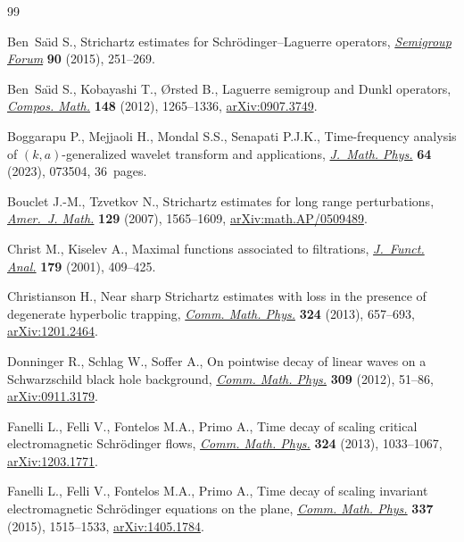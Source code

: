 \documentclass[10pt,a4paper]{amsart}
\numberwithin{equation}{section}
\begin{document}
\begin{thebibliography}{99}
\footnotesize\itemsep=0pt

Ben~Sa\"{\i}d S., Strichartz estimates for {S}chr\"odinger--{L}aguerre
 operators, \href{https://doi.org/10.1007/s00233-014-9617-9}{\textit{Semigroup Forum}} \textbf{90} (2015), 251--269.

Ben~Sa\"{\i}d S., Kobayashi T., {\O}rsted B., Laguerre semigroup and {D}unkl
 operators, \href{https://doi.org/10.1112/S0010437X11007445}{\textit{Compos. Math.}} \textbf{148} (2012), 1265--1336,
 \href{https://arxiv.org/abs/0907.3749}{arXiv:0907.3749}.

Boggarapu P., Mejjaoli H., Mondal S.S., Senapati P.J.K., Time-frequency
 analysis of {$(k, a)$}-generalized wavelet transform and applications,
 \href{https://doi.org/10.1063/5.0152806}{\textit{J.~Math. Phys.}} \textbf{64} (2023), 073504, 36~pages.

Bouclet J.-M., Tzvetkov N., Strichartz estimates for long range perturbations,
 \href{https://doi.org/10.1353/ajm.2007.0039}{\textit{Amer.~J. Math.}} \textbf{129} (2007), 1565--1609,
 \href{https://arxiv.org/abs/math.AP/0509489}{arXiv:math.AP/0509489}.

Christ M., Kiselev A., Maximal functions associated to filtrations,
 \href{https://doi.org/10.1006/jfan.2000.3687}{\textit{J.~Funct. Anal.}} \textbf{179} (2001), 409--425.

Christianson H., Near sharp {S}trichartz estimates with loss in the presence of
 degenerate hyperbolic trapping, \href{https://doi.org/10.1007/s00220-013-1805-z}{\textit{Comm. Math. Phys.}} \textbf{324}
 (2013), 657--693, \href{https://arxiv.org/abs/1201.2464}{arXiv:1201.2464}.

Donninger R., Schlag W., Soffer A., On pointwise decay of linear waves on a
 {S}chwarzschild black hole background, \href{https://doi.org/10.1007/s00220-011-1393-8}{\textit{Comm. Math. Phys.}}
 \textbf{309} (2012), 51--86, \href{https://arxiv.org/abs/0911.3179}{arXiv:0911.3179}.

Fanelli L., Felli V., Fontelos M.A., Primo A., Time decay of scaling critical
 electromagnetic {S}chr\"odinger flows, \href{https://doi.org/10.1007/s00220-013-1830-y}{\textit{Comm. Math. Phys.}}
 \textbf{324} (2013), 1033--1067, \href{https://arxiv.org/abs/1203.1771}{arXiv:1203.1771}.

Fanelli L., Felli V., Fontelos M.A., Primo A., Time decay of scaling invariant
 electromagnetic {S}chr\"odinger equations on the plane, \href{https://doi.org/10.1007/s00220-015-2291-2}{\textit{Comm. Math.
 Phys.}} \textbf{337} (2015), 1515--1533, \href{https://arxiv.org/abs/1405.1784}{arXiv:1405.1784}.


\end{thebibliography}
\end{document}
